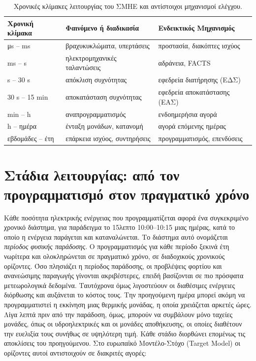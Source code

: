 \begin{table}[!htbp]
\centering
\begin{tabular}{lll}
\hline
Χρονική κλίμακα & Φαινόμενο ή διαδικασία & Ενδεικτικός Μηχανισμός \\
\hline
μs -- ms   & βραχυκυκλώματα, υπερτάσεις   & προστασία, διακόπτες ισχύος \\
ms -- s    & ηλεκτρομηχανικές ταλαντώσεις & αδράνεια, FACTS \\
s -- 30 s  & απόκλιση συχνότητας          & εφεδρεία διατήρησης (ΕΔΣ) \\
30 s -- 15 min & αποκατάσταση συχνότητας  & εφεδρεία αποκατάστασης (ΕΑΣ) \\
min -- h   & αναπρογραμματισμός           & ενδοημερήσια αγορά \\
h -- ημέρα & ένταξη μονάδων, κατανομή     & αγορά επόμενης ημέρας \\
εβδομάδες -- έτη & επάρκεια ισχύος, συντηρήσεις & προγραμματισμός, επενδύσεις \\
\hline
\end{tabular}
\caption{Χρονικές κλίμακες λειτουργίας του ΣΜΗΕ και αντίστοιχοι μηχανισμοί ελέγχου.}
\label{tab:chronikes-klimakes}
\end{table}

\section{Στάδια λειτουργίας: από τον προγραμματισμό στον πραγματικό χρόνο}
\label{sec:stages}

Κάθε ποσότητα ηλεκτρικής ενέργειας που προγραμματίζεται αφορά ένα συγκεκριμένο χρονικό
διάστημα, για παράδειγμα το 15λεπτο 10:00--10:15 μιας ημέρας, κατά το οποίο η ενέργεια
παράγεται και καταναλώνεται. Το διάστημα αυτό ονομάζεται \emph{περίοδος φυσικής παράδοσης}.
Ο προγραμματισμός για κάθε περίοδο ξεκινά έτη νωρίτερα και ολοκληρώνεται σε πραγματικό χρόνο,
σε διαδοχικούς χρονικούς ορίζοντες. Όσο πλησιάζει η περίοδος παράδοσης, οι προβλέψεις φορτίου
και ανανεώσιμης παραγωγής γίνονται ακριβέστερες, επειδή βασίζονται σε πιο πρόσφατα
μετεωρολογικά δεδομένα. Ταυτόχρονα όμως λιγοστεύουν οι διαθέσιμες ενέργειες διόρθωσης και
αυξάνεται το κόστος τους. Την προηγούμενη ημέρα μπορεί ακόμη να προγραμματιστεί η εκκίνηση
μιας θερμικής μονάδας, η οποία χρειάζεται αρκετές ώρες. Λίγα λεπτά πριν από την παράδοση,
όμως, μπορούν να συμβάλουν μόνο ταχείες μονάδες, όπως οι υδροηλεκτρικές και οι μονάδες
αποθήκευσης, οι οποίες διαθέτουν την ευελιξία τους συνήθως σε υψηλότερη τιμή. Κάθε στάδιο
διορθώνει επομένως τις αποκλίσεις του προηγούμενου. Στο ευρωπαϊκό
Μοντέλο-Στόχο (Target Model) οι ορίζοντες αυτοί αντιστοιχούν σε διακριτές αγορές:

